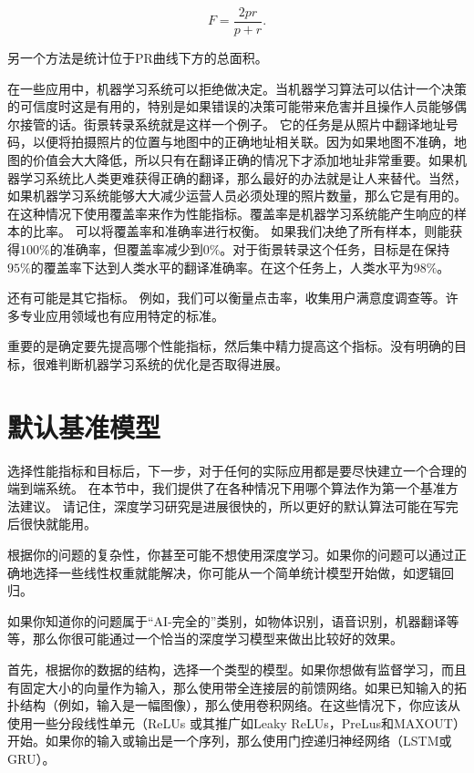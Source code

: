 \begin{equation}
        F = \frac{2pr}{p+r}.
\end{equation}

另一个方法是统计位于PR曲线下方的总面积。

在一些应用中，机器学习系统可以拒绝做决定。当机器学习算法可以估计一个决策的可信度时这是有用的，特别是如果错误的决策可能带来危害并且操作人员能够偶尔接管的话。街景转录系统就是这样一个例子。 它的任务是从照片中翻译地址号码，以便将拍摄照片的位置与地图中的正确地址相关联。因为如果地图不准确，地图的价值会大大降低，所以只有在翻译正确的情况下才添加地址非常重要。如果机器学习系统比人类更难获得正确的翻译，那么最好的办法就是让人来替代。当然，如果机器学习系统能够大大减少运营人员必须处理的照片数量，那么它是有用的。在这种情况下使用覆盖率来作为性能指标。覆盖率是机器学习系统能产生响应的样本的比率。 可以将覆盖率和准确率进行权衡。 如果我们决绝了所有样本，则能获得$100\%$的准确率，但覆盖率减少到$0\%$。对于街景转录这个任务，目标是在保持$95\%$的覆盖率下达到人类水平的翻译准确率。在这个任务上，人类水平为$98\%$。

还有可能是其它指标。 例如，我们可以衡量点击率，收集用户满意度调查等。许多专业应用领域也有应用特定的标准。

重要的是确定要先提高哪个性能指标，然后集中精力提高这个指标。没有明确的目标，很难判断机器学习系统的优化是否取得进展。


\section{默认基准模型}

选择性能指标和目标后，下一步，对于任何的实际应用都是要尽快建立一个合理的端到端系统。 在本节中，我们提供了在各种情况下用哪个算法作为第一个基准方法建议。 请记住，深度学习研究是进展很快的，所以更好的默认算法可能在写完后很快就能用。

根据你的问题的复杂性，你甚至可能不想使用深度学习。如果你的问题可以通过正确地选择一些线性权重就能解决，你可能从一个简单统计模型开始做，如逻辑回归。

如果你知道你的问题属于“AI-完全的”类别，如物体识别，语音识别，机器翻译等等，那么你很可能通过一个恰当的深度学习模型来做出比较好的效果。

首先，根据你的数据的结构，选择一个类型的模型。如果你想做有监督学习，而且有固定大小的向量作为输入，那么使用带全连接层的前馈网络。如果已知输入的拓扑结构（例如，输入是一幅图像），那么使用卷积网络。在这些情况下，你应该从使用一些分段线性单元（ReLUs 或其推广如Leaky ReLUs，PreLus和MAXOUT）开始。如果你的输入或输出是一个序列，那么使用门控递归神经网络（LSTM或GRU）。


